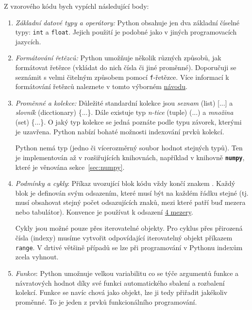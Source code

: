 \documentclass[a4paper,11pt,twoside]{article}
\def\code#1{\textnormal{\texttt{#1}}}
\def\file#1{\textnormal{\textbf{\texttt{#1}}}}
\theoremstyle{red}
\theoremstyle{green}
\begin{document}
    Z vzorového kódu bych vypíchl následující body:
    \begin{enumerate}
        \item 
            \emph{Základní datové typy a operátory:}
            Python obsahuje jen dva základní číselné typy: \code{int} a \code{float}.
            Jejich použití je podobné jako v jiných programovacích jazycích.

        \item
            \emph{Formátování řetězců:}
            Python umožňuje několik různých způsobů, jak formátovat řetězce (vkládat do nich čísla či jiné proměnné).
            Doporučuji se seznámit s velmi čitelným způsobem pomocí \code{f}-řetězce.            
            Více informací k formátování řetězců naleznete v tomto výborném \href{https://pyformat.info}{návodu}.
    
        \item
            \emph{Proměnné a kolekce:} 
            Důležité standardní kolekce jsou \emph{seznam} (list) [...] a \emph{slovník} (dicctionary) \{...\}.
            Dále existuje typ \emph{n-tice} (tuple) (...) a \emph{množina} (set) \{...\}.
            O jaký typ kolekce se jedná poznáte podle typu závorek, kterými je uzavřena.
            Python nabízí bohaté možnosti indexování prvků kolekcí.

            Python nemá typ  (jedno či vícerozměrný soubor hodnot stejných typů).
            Ten je implementován až v rozšiřujících knihovnách, například v knihovně \file{numpy}, které je věnována sekce~\ref{sec:numpy}.
            
        \item
            \emph{Podmínky a cykly}:
            Příkaz uvozující blok kódu vždy končí znakem \uv{:}.
            Každý blok je definován svým odsazením, které musí být na každém řádku stejné
            (tj. musí obsahovat stejný počet odsazujících znaků, mezi které patří buď mezera nebo tabulátor).
            Konvence je používat k odsazení \href{https://www.python.org/dev/peps/pep-0008/#indentation}{4 mezery}.

            Cykly jsou možné pouze přes iterovatelné objekty.
            Pro cyklus přes přirozená čísla (indexy) musíme vytvořit odpovídající iterovatelný objekt příkazem \code{range}.
            V drtivé většině případů se lze při programování v Pythonu indexům zcela vyhnout.

        \item 
            \emph{Funkce}: Python umožnuje velkou variabilitu co se týče argumentů funkce a návratových hodnot díky své funkci automatického sbalení a rozbalení kolekcí.
            Funkce se navíc chová jako objekt, lze ji tedy přiřadit jakékoliv proměnné.
            To je jeden z prvků funkcionálního programování.


\end{enumerate}
\end{document}
